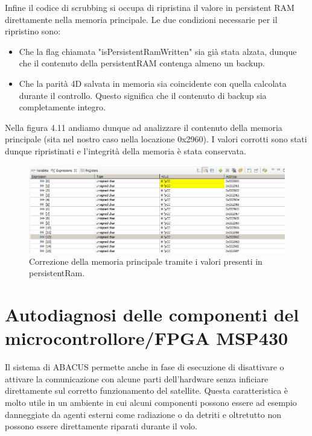 \documentclass[LaM,binding=0.6cm,oneside]{../sapthesis}
\begin{document}
Infine il codice di scrubbing si occupa di ripristina il valore in persistent RAM direttamente nella memoria principale.
Le due condizioni necessarie per il ripristino sono:
\begin{itemize}
    \item Che la flag chiamata "isPersistentRamWritten" sia già stata alzata, dunque che il contenuto della persistentRAM contenga almeno un backup.
    
    \item Che la parità 4D salvata in memoria sia coincidente con quella calcolata durante il controllo. Questo significa che il contenuto di backup sia completamente integro.
    
\end{itemize}
Nella figura 4.11 andiamo dunque ad analizzare il contenuto della memoria principale (sita nel nostro caso nella locazione 0x2960). I valori corrotti sono stati dunque ripristinati e l'integrità della memoria è stata conservata.
\begin{figure}[htbp]
\centerline{\includegraphics[scale=0.6]{examples/7_CorrezioneMemory.JPG}}
\caption{Correzione della memoria principale tramite i valori presenti in persistentRam.}
\label{fig}
\end{figure}
\vspace{0.5cm}

\chapter{Autodiagnosi delle componenti del microcontrollore/FPGA MSP430}

Il sistema di ABACUS permette anche in fase di esecuzione di disattivare o attivare la comunicazione con alcune parti dell’hardware senza inficiare direttamente sul corretto funzionamento del satellite. 
Questa caratteristica è molto utile in un ambiente in cui alcuni componenti possono essere ad esempio danneggiate da agenti esterni come radiazione o da detriti e oltretutto non possono essere direttamente riparati durante il volo. 
\end{document}
